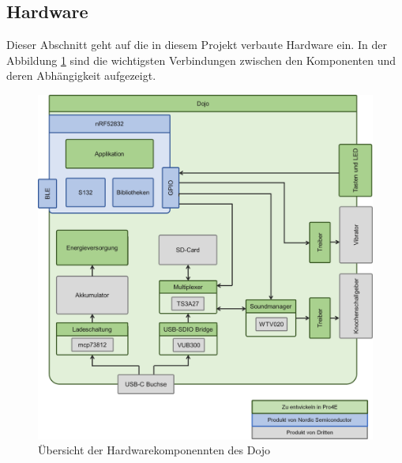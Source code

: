 \documentclass[10pt,a4paper,oneside]{99_fhnwreport}
\begin{document}
\newpage

\subsection{Hardware} \label{sec:hardware}

Dieser Abschnitt geht auf die in diesem Projekt verbaute Hardware ein. In der Abbildung \ref{fig:dojo} sind die wichtigsten Verbindungen zwischen den Komponenten und deren Abhängigkeit aufgezeigt.

\begin{figure}[htb]
\includegraphics[width=\textwidth]{Dojo.png}
\caption{Übersicht der Hardwarekomponennten des Dojo} %
\label{fig:dojo}
\end{figure}
\end{document}
